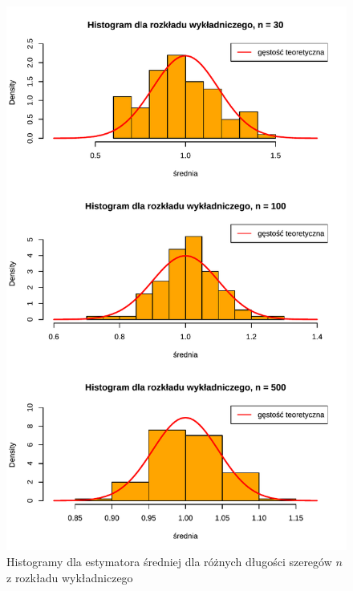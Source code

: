 \documentclass[10pt, a4paper]{article}\usepackage[]{graphicx}\usepackage[]{xcolor}
\makeatletter
\def\maxwidth{ %
  \ifdim\Gin@nat@width>\linewidth
    \linewidth
  \else
    \Gin@nat@width
  \fi
}
\newenvironment{knitrout}{}{} %
\makeatother
\begin{document}
\begin{knitrout}
\color{fgcolor}\begin{figure}[H]

{\centering \includegraphics[width=\maxwidth]{figure/analiza-sredniej-exp-hist-1} 

}

\caption[Histogramy dla estymatora średniej dla różnych długości szeregów $n$ z rozkładu wykładniczego]{Histogramy dla estymatora średniej dla różnych długości szeregów $n$ z rozkładu wykładniczego}\label{fig:analiza-sredniej-exp-hist}
\end{figure}

\end{knitrout}
\end{document}
